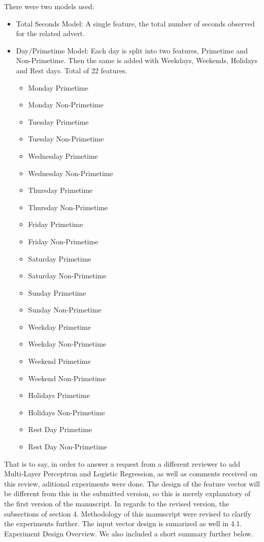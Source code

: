 \documentclass[review]{elsarticle}
\begin{document}
There were two models used:
\begin{itemize}
    \item{Total Seconds Model: A single feature, the total number of seconds observed for the related advert.}

    \item{Day/Primetime Model: Each day is split into two features, Primetime and Non-Primetime. Then the same is added with Weekdays, Weekends, Holidays and Rest days. Total of 22 features.}

    \begin{itemize}
        \item Monday Primetime
        \item Monday Non-Primetime
        \item Tuesday Primetime
        \item Tuesday Non-Primetime
        \item Wednesday Primetime
        \item Wednesday Non-Primetime
        \item Thursday Primetime
        \item Thursday Non-Primetime
        \item Friday Primetime
        \item Friday Non-Primetime
        \item Saturday Primetime
        \item Saturday Non-Primetime
        \item Sunday Primetime
        \item Sunday Non-Primetime
        \item Weekday Primetime
        \item Weekday Non-Primetime
        \item Weekend Primetime
        \item Weekend Non-Primetime
        \item Holidays Primetime
        \item Holidays Non-Primetime
        \item Rest Day Primetime
        \item Rest Day Non-Primetime
    \end{itemize}
\end{itemize}

That is to say, in order to answer a request from a different reviewer to add Multi-Layer Perceptron and Logistic Regression, as well as comments received on this review, aditional experiments were done. The design of the feature vector will be different from this in the submitted version, so this is merely explanatory of the first version of the manuscript. In regards to the revised version, the subsections of section 4. Methodology of this manuscript were revised to clarify the experiments further. The input vector design is sumarized as well in 4.1. Experiment Design Overview. We also included a short summary further below.
\end{document}
